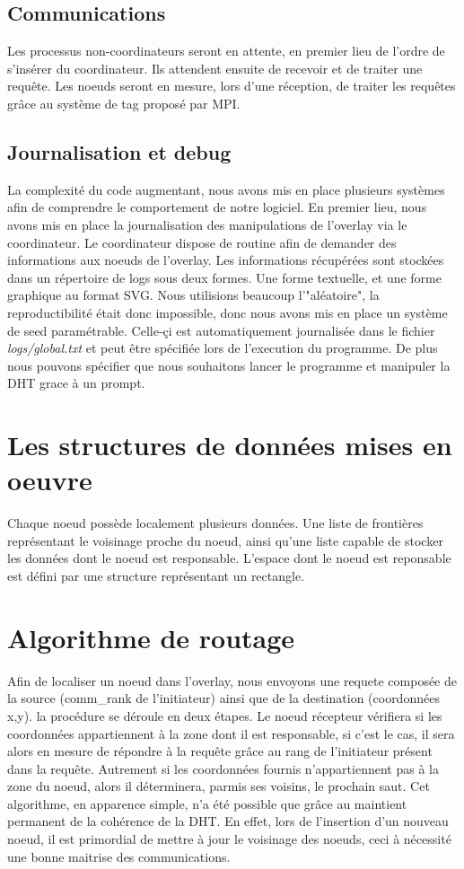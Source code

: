 \documentclass[a4paper, 11pt, french]{article}
\begin{document}
\subsection{Communications}
Les processus non-coordinateurs seront en attente, en premier lieu de l'ordre de s'insérer du coordinateur. Ils attendent ensuite de recevoir et de traiter une requête. Les noeuds seront en mesure, lors d'une réception, de traiter les requêtes grâce au système de tag proposé par MPI.
\subsection{Journalisation et debug}
La complexité du code augmentant, nous avons mis en place plusieurs systèmes afin de comprendre le comportement de notre logiciel. En premier lieu, nous avons mis en place la journalisation des manipulations de l'overlay via le coordinateur. Le coordinateur dispose de routine afin de demander des informations aux noeuds de l'overlay. Les informations récupérées sont stockées dans un répertoire de logs sous deux formes. Une forme textuelle, et une forme graphique au format SVG. Nous utilisions beaucoup l'"aléatoire", la reproductibilité était donc impossible, donc nous avons mis en place un système de seed paramétrable. Celle-çi est automatiquement journalisée dans le fichier \textit{logs/global.txt} et peut être spécifiée lors de l'execution du programme. De plus nous pouvons spécifier que nous souhaitons lancer le programme et manipuler la DHT grace à un prompt.

\section {Les structures de données mises en oeuvre}
Chaque noeud possède localement plusieurs données. Une liste de frontières représentant le voisinage proche du noeud, ainsi qu'une liste capable de stocker les données dont le noeud est responsable. L'espace dont le noeud est reponsable est défini par une structure représentant un rectangle.

\section{Algorithme de routage}
Afin de localiser un noeud dans l'overlay, nous envoyons une requete composée de la source (comm_rank de l'initiateur) ainsi que de la destination (coordonnées x,y). la procédure se déroule en deux étapes. Le noeud récepteur vérifiera si les coordonnées appartiennent à la zone dont il est responsable, si c'est le cas, il sera alors en mesure de répondre à la requête grâce au rang de l'initiateur présent dans la requête. Autrement si les coordonnées fournis n'appartiennent pas à la zone du noeud, alors il déterminera, parmis ses voisins, le prochain saut.
Cet algorithme, en apparence simple, n'a été possible que grâce au maintient permanent de la cohérence de la DHT. En effet, lors de l'insertion d'un nouveau noeud, il est primordial de mettre à jour le voisinage des noeuds, ceci à nécessité une bonne maitrise des communications.
\end{document}
